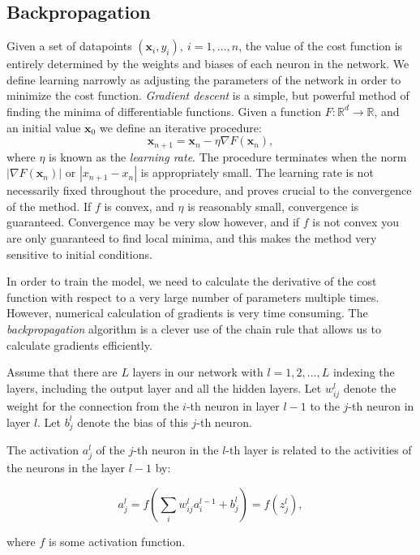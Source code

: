 \subsection{Backpropagation}
Given a set of datapoints $(\bm{x}_i, y_i), \ i=1,\dots,n$,
the value of the cost function is entirely determined
by the weights and biases of each neuron in the network.
We define learning narrowly as adjusting the parameters of the network
in order to minimize the cost function.
\newline
\textit{Gradient descent} is a simple, but powerful method
of finding the minima of differentiable functions.
Given a function $F: \mathbb{R}^d \rightarrow \mathbb{R}$, and an initial
value $\bm{x}_0$ we define an iterative procedure:
$$ \bm{x}_{n+1} = \bm{x}_{n} - \eta \nabla F(\bm{x}_n), $$
where $\eta$ is known as the \textit{learning rate}.
The procedure terminates when the norm
$ \left| \nabla F(\bm{x}_n) \right| $ or
$ \left| x_{n+1} - x_{n} \right| $
is appropriately small.
\newline
The learning rate is not necessarily fixed throughout the procedure,
and proves crucial to the convergence of the method. If $f$
is convex, and $\eta$ is reasonably small, convergence is guaranteed.
Convergence may be very slow however, and if $f$ is not convex
you are only guaranteed to find local minima, and this makes
the method very sensitive to initial conditions.
\par
In order to train the model, we need to calculate the derivative of the cost
function with respect to a very large number of parameters multiple times. However,
numerical calculation of gradients is very time consuming. The \textit{backpropagation}
algorithm is a clever use of the chain rule that allows us to calculate gradients efficiently.
\par
Assume that there are $L$ layers in our network with $l = 1,2,...,L$ indexing the layers, including
the output layer and all the hidden layers.
Let $w_{ij}^l$ denote the weight for the connection
from the $i$-th neuron in layer $l - 1$ to the $j$-th neuron in layer $l$. Let $b_{j}^l$ denote the bias of this $j$-th neuron.

The activation $a_{j}^l$ of the $j$-th neuron in the $l$-th layer is related to the activities of the neurons in the layer $l - 1$ by:

$$ a_{j}^l = f \left( \sum_i w_{ij}^l a_i^{l-1} + b_j^l \right) = f \left( z_j^l \right) ,$$

where $f$ is some activation function.

